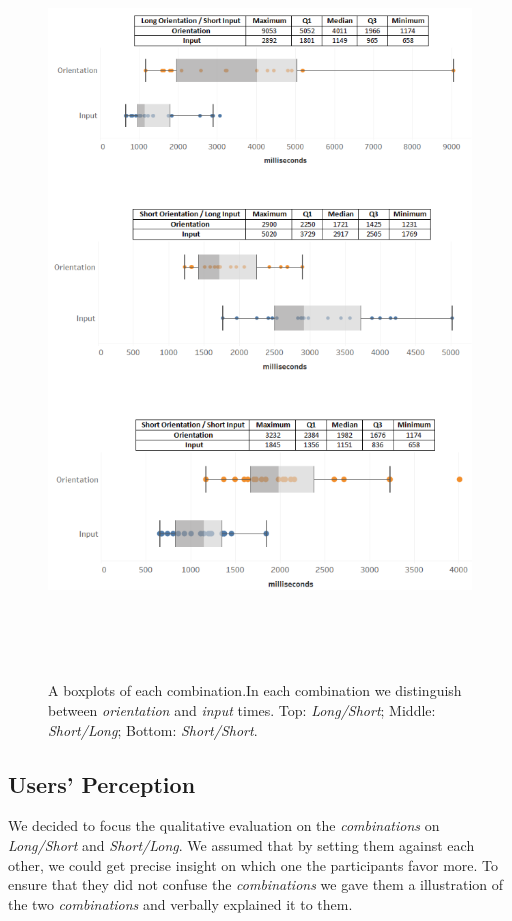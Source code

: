 \begin{figure}[t!]
\centering
\includegraphics[width=14cm, height=20cm]{Chapters/graphics/Times.png}
\caption{A boxplots of each combination.In each combination we distinguish between \textit{orientation} and \textit{input} times. Top: \textit{Long/Short}; Middle: \textit{Short/Long}; Bottom: \textit{Short/Short}.}
\label{fig:times}
\end{figure}

\subsection{Users' Perception}

We decided to focus the qualitative evaluation on the \textit{combinations} on \textit{Long/Short} and \textit{Short/Long}. We assumed that by setting them against each other, we could get precise insight on which one the participants favor more. To ensure that they did not confuse the \textit{combinations} we gave them a illustration of the two \textit{combinations} and verbally explained it to them.

